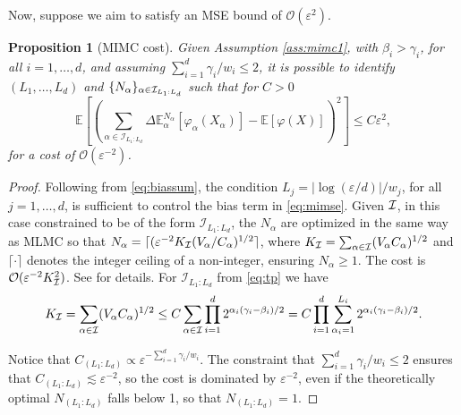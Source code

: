 \documentclass[english]{article}
\newtheorem{prop}{Proposition}[section]
\newcommand{\bbE}{\mathbb{E}}
\newcommand{\cO}{\mathcal{O}}
\newcommand{\cI}{{\cal I}}
\begin{document}
Now, suppose we aim to satisfy an MSE bound of $\cO(\varepsilon^2)$.

\begin{prop}[MIMC cost]\label{pro:mimc}
Given Assumption \ref{ass:mimc1}, with $\beta_i>\gamma_i$, for all $i=1,\dots, d$,
and assuming %
$\sum_{i=1}^d \gamma_i/w_i %
\leq 2$,
it is possible to identify $(L_1,\dots,L_d)$
and $\{ N_\alpha \}_{\alpha \in \cI_{ L_1:L_d}}$ such that for $C>0$
$$
\bbE\left [ \left (\sum_{\alpha\in\mathcal{I}_{ L_1:L_d}} \Delta \mathbb{E}^{N_\alpha}_{\alpha}[\varphi_{\alpha}(X_{\alpha})] 
- \mathbb{E}[\varphi(X)] \right )^2 \right ] \leq C \varepsilon^2,
$$
for a cost of $\cO(\varepsilon^{-2})$.
\end{prop}
\begin{proof}
Following from \eqref{eq:biassum}, the condition $L_j=|\log(\varepsilon/d)|/w_j$,
for all $j=1,\dots, d$, is sufficient to control the bias term in \eqref{eq:mimse}.
Given $\cI$, in this case constrained to be of the form $\mathcal{I}_{ L_1:L_d}$,
the $N_\alpha$ are optimized in the same way as MLMC so that 
$N_\alpha = \lceil(\varepsilon^{-2} K_\cI (V_\alpha/C_\alpha)^{1/2}\rceil$,
 where $K_\cI = \sum_{\alpha\in \cI} (V_\alpha C_\alpha)^{1/2}$ and $\lceil \cdot \rceil$
 denotes the integer ceiling of a non-integer, ensuring $N_\alpha\geq1$.
The cost is $\cO(\varepsilon^{-2}K_\cI^2)$.
See \cite{giles, ours, mlpf} for details.
For $\mathcal{I}_{ L_1:L_d}$ from \eqref{eq:tp} we have %
\begin{equation}\label{eq:tpcost}
K_\cI = \sum_{\alpha\in \cI} (V_\alpha C_\alpha)^{1/2} \le C\sum_{\alpha\in\cI}\prod_{i=1}^d 2^{\alpha_i(\gamma_i-\beta_i)/2}= 
C\prod_{i=1}^d \sum_{\alpha_i=1}^{L_i} 2^{\alpha_i(\gamma_i-\beta_i)/2}.
\end{equation}

Notice that $C_{(L_1:L_d)} \propto \varepsilon^{-\sum_{i=1}^d \gamma_i/w_i}$.
The constraint that 
$\sum_{i=1}^d \gamma_i/w_i %
\leq 2$ 
ensures that 
$C_{(L_1:L_d)} \lesssim \varepsilon^{-2}$, 
so the cost is dominated by $\varepsilon^{-2}$,
even if the theoretically optimal $N_{(L_1:L_d)}$
falls below 1, so that $N_{(L_1:L_d)}=1$.
\end{proof}
\end{document}
